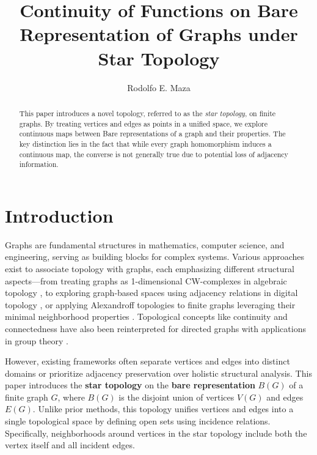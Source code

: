 \documentclass{amsart}
\theoremstyle{definition}
\theoremstyle{remark}
\numberwithin{equation}{section}
\begin{document}
	
	\title{Continuity of Functions on Bare Representation of Graphs under Star Topology}
	
	\author{Rodolfo E. Maza}
	\address{Map\'ua University, Intramuros, Manila 1002, Philippines}
	\address{University of the Philippines-Diliman, Quezon City 1101, Philippines}
	
	
	\begin{abstract}
		This paper introduces a novel topology, referred to as the \textit{star topology}, on finite graphs. By treating vertices and edges as points in a unified space, we explore continuous maps between Bare representations of a graph and their properties. The key distinction lies in the fact that while every graph homomorphism induces a continuous map, the converse is not generally true due to potential loss of adjacency information.
	\end{abstract}
	
	\maketitle
	
	\section{Introduction}
	\label{Intro:sec}
	
	Graphs are fundamental structures in mathematics, computer science, and engineering, serving as building blocks for complex systems. Various approaches exist to associate topology with graphs, each emphasizing different structural aspects—from treating graphs as 1-dimensional CW-complexes in algebraic topology \cite{massey2019basic}, to exploring graph-based spaces using adjacency relations in digital topology \cite{NoglySchladt1996}, or applying Alexandroff topologies to finite graphs leveraging their minimal neighborhood properties \cite{JafarianAmiriJafarzadeh2013}. Topological concepts like continuity and connectedness have also been reinterpreted for directed graphs with applications in group theory \cite{serre1977arbres}.
	
	However, existing frameworks often separate vertices and edges into distinct domains or prioritize adjacency preservation over holistic structural analysis. This paper introduces the \textbf{star topology} on the \textbf{bare representation} \( B(G) \) of a finite graph \( G \), where \( B(G) \) is the disjoint union of vertices \( V(G) \) and edges \( E(G) \). Unlike prior methods, this topology unifies vertices and edges into a single topological space by defining open sets using incidence relations. Specifically, neighborhoods around vertices in the star topology include both the vertex itself and all incident edges.
	
\end{document}
